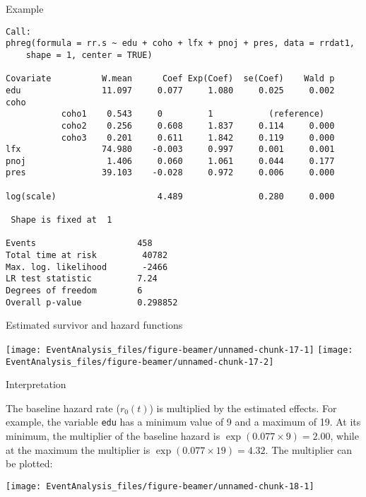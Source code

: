 \documentclass[10pt,ignorenonframetext,]{beamer}
\begin{document}
\begin{frame}[fragile]{Example}

\scriptsize

\begin{verbatim}
Call:
phreg(formula = rr.s ~ edu + coho + lfx + pnoj + pres, data = rrdat1, 
    shape = 1, center = TRUE)

Covariate          W.mean      Coef Exp(Coef)  se(Coef)    Wald p
edu                11.097     0.077     1.080     0.025     0.002 
coho 
           coho1    0.543     0         1           (reference)
           coho2    0.256     0.608     1.837     0.114     0.000 
           coho3    0.201     0.611     1.842     0.119     0.000 
lfx                74.980    -0.003     0.997     0.001     0.001 
pnoj                1.406     0.060     1.061     0.044     0.177 
pres               39.103    -0.028     0.972     0.006     0.000 

log(scale)                    4.489               0.280     0.000 

 Shape is fixed at  1 

Events                    458 
Total time at risk         40782 
Max. log. likelihood       -2466 
LR test statistic         7.24 
Degrees of freedom        6 
Overall p-value           0.298852
\end{verbatim}

\end{frame}

\begin{frame}{Estimated survivor and hazard functions}

\texttt{[image: EventAnalysis\_files/figure-beamer/unnamed-chunk-17-1]}
\texttt{[image: EventAnalysis\_files/figure-beamer/unnamed-chunk-17-2]}

\end{frame}

\begin{frame}[fragile]{Interpretation}

\small
The baseline hazard rate (\(r_0(t)\)) is multiplied by the estimated
effects. For example, the variable \texttt{edu} has a minimum value of 9
and a maximum of 19. At its minimum, the multiplier of the baseline
hazard is \(\exp(0.077 \times 9) = 2.00\), while at the maximum the
multiplier is \(\exp(0.077 \times 19) = 4.32\). The multiplier can be
plotted:

\begin{center}\texttt{[image: EventAnalysis\_files/figure-beamer/unnamed-chunk-18-1]} \end{center}

\end{frame}
\end{document}
